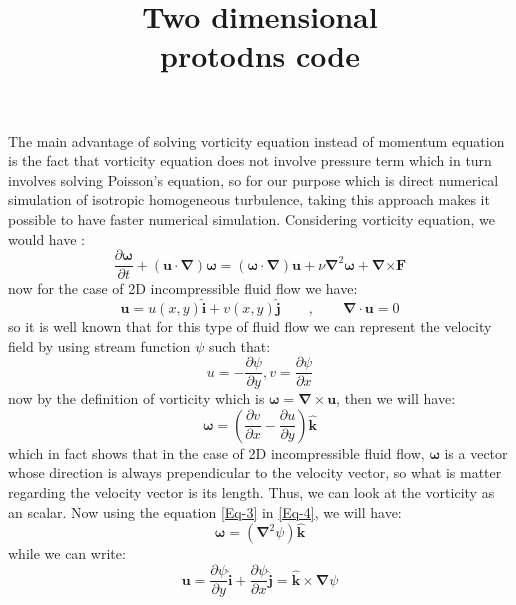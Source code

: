 \documentclass[10pt]{article}
\title{\huge{\textbf{Two dimensional \\ \vspace{1cm} protodns code}}}
\date{}
\begin{document}
\maketitle
The main advantage of solving vorticity equation instead of momentum equation is the fact that vorticity equation does not involve pressure term which in turn involves solving Poisson's equation, so for our purpose which is direct numerical simulation of isotropic homogeneous turbulence, taking this approach makes it possible to have faster numerical simulation. Considering vorticity equation, we would have :
%
\begin{equation}\label{Eq-1-Vorticity}	
\frac{\partial{\bm{\omega}}}{\partial t} + (\bm{u}\cdot\bm{\nabla})\bm{\omega}=(\bm{\omega}\cdot\bm{\nabla})\bm{u} + \nu\bm{\nabla}^2\bm{\omega} + \bm{\nabla}\bm{\times}\bm{F}
\end{equation}
%
now for the case of 2D incompressible fluid flow we have:
%
\begin{equation}\label{Eq-2}
\bm{u}=u(x,y)\bm{\hat{i}}+v(x,y)\bm{\hat{j}}\qquad, \qquad \bm{\nabla}\cdot\bm{u}=0
\end{equation}
%
so it is well known that for this type of fluid flow we can represent the velocity field by using stream function $\psi$ such that:
%
\begin{equation}\label{Eq-3}
u=-\frac{\partial\psi}{\partial y}, v=\frac{\partial\psi}{\partial x}
\end{equation}
%
now by the definition of vorticity which is $\bm{\omega}=\bm{\nabla}\times\bm{u}$, then we will have:
%
\begin{equation}\label{Eq-4}
\bm{\omega}=(\frac{\partial v}{\partial x}-\frac{\partial u}{\partial y})\bm{\hat{k}}
\end{equation}
%
which in fact shows that in the case of 2D incompressible fluid flow, $\bm{\omega}$ is a vector whose direction is always prependicular to the velocity vector, so what is matter regarding the velocity vector is its length. Thus, we can look at the vorticity as an scalar. Now using the equation \eqref{Eq-3} in \eqref{Eq-4}, we will have:
%
\begin{equation}\label{Eq-5}
\bm{\omega}=({\bm{\nabla}}^2\psi)\bm{\hat{k}}
\end{equation}
%
while we can write:
%
\begin{equation}\label{Eq-6}
\bm{u}=\frac{\partial\psi}{\partial y}\bm{\hat{i}}+\frac{\partial\psi}{\partial x}\bm{\hat{j}}=\bm{\hat{k}}\times\bm{\nabla}\psi
\end{equation}
\end{document}

